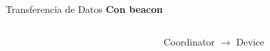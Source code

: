 \documentclass[aspectratio=169, handout]{beamer}
\begin{document}
\begin{frame}[t]{Transferencia de Datos}
\textbf{Con beacon}
\begin{columns}[t]
	\begin{column}{.5\textwidth}
		\begin{minipage}[t][0.7\textheight][s]{\columnwidth}
			\begin{figure}[H]
				\vfill
				\vspace{10px}
			\end{figure}
		\end{minipage}
	\end{column}
	\begin{column}{.5\textwidth}
		\begin{minipage}[t][0.7\textheight][s]{\columnwidth}
			\begin{figure}[H]
				\vfill
				\caption{Coordinator $\rightarrow$ Device}
			\end{figure}	 		
		\end{minipage}
	\end{column}
\end{columns}
\end{frame}
\end{document}
